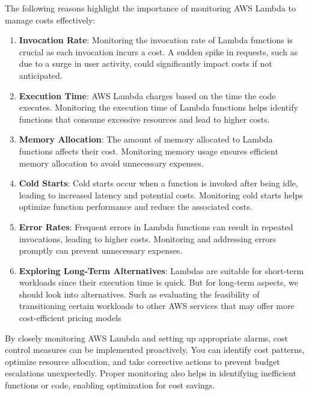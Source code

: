 The following reasons highlight the importance of monitoring AWS Lambda to manage costs effectively:
\begin{enumerate}
    \item \textbf{Invocation Rate}: Monitoring the invocation rate of Lambda functions is crucial as each invocation incurs a cost. A sudden spike in requests, such as due to a surge in user activity, could significantly impact costs if not anticipated.

    \item \textbf{Execution Time}: AWS Lambda charges based on the time the code executes. Monitoring the execution time of Lambda functions helps identify functions that consume excessive resources and lead to higher costs.

    \item \textbf{Memory Allocation}: The amount of memory allocated to Lambda functions affects their cost. Monitoring memory usage ensures efficient memory allocation to avoid unnecessary expenses.

    \item \textbf{Cold Starts}: Cold starts occur when a function is invoked after being idle, leading to increased latency and potential costs. Monitoring cold starts helps optimize function performance and reduce the associated costs.

    \item \textbf{Error Rates}: Frequent errors in Lambda functions can result in repeated invocations, leading to higher costs. Monitoring and addressing errors promptly can prevent unnecessary expenses.

    \item \textbf{Exploring Long-Term Alternatives}: Lambdas are suitable for short-term workloads since their execution time is quick. But for long-term aspects, we should look into alternatives. Such as evaluating the feasibility of transitioning certain workloads to other AWS services that may offer more cost-efficient pricing models  
\end{enumerate}

By closely monitoring AWS Lambda and setting up appropriate alarms, cost control measures can be implemented proactively. You can identify cost patterns, optimize resource allocation, and take corrective actions to prevent budget escalations unexpectedly. Proper monitoring also helps in identifying inefficient functions or code, enabling optimization for cost savings.


\newpage

